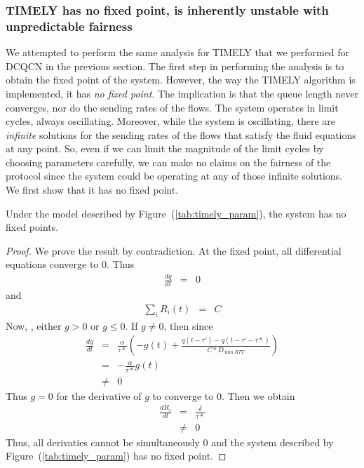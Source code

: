 \subsubsection{TIMELY has no fixed point, is inherently unstable with
unpredictable fairness}
We attempted to perform the same analysis for TIMELY that we performed for DCQCN
in the previous section.  The first step in performing the analysis is to obtain
the fixed point of the system.  However, the way the TIMELY algorithm is
implemented, it has \emph{no fixed point}. The implication is that the queue
length never converges, nor do the sending rates of the flows. The system
operates in limit cycles, always oscillating. Moreover, while the system is
oscillating, there are \emph{infinite} solutions for the sending rates of the
flows that satisfy the fluid equations at any point. So, even if we can limit
the magnitude of the limit cycles by choosing parameters carefully, we can make
no claims on the fairness of the protocol since the system could be operating at
any of those infinite solutions. We first show that it has no fixed point.

\begin{thm} 
\label{thm:nofixed}
Under the model described by Figure~(\ref{tab:timely_param}), the system has no
fixed points.
\end{thm}
\begin{proof}
We prove the result by contradiction. At the fixed point, all
differential equations converge to 0. Thus
\begin{eqnarray*}
\frac{dq}{dt} & =& 0 
\end{eqnarray*}  and 
\begin{eqnarray*} \sum_{i} R_i(t) & = & C \end{eqnarray*}
Now, , either $g > 0$ or $g  \le 0$. If $g \ne 0$, then since 
\begin{eqnarray*}
\frac{{dg}}{{dt}} & = & \frac{\alpha }{{\tau *}}( - g(t) + \frac{{q(t
                        - \tau ') - q(t - \tau ' - \tau
                        *)}}{{C*{D_{\min RTT}}}})\\
& = &  -\frac{\alpha }{{\tau *}} g(t)  \\
& \ne & 0 
\end{eqnarray*}
Thus $ g = 0$ for the derivative of  $g$ to converge to 0. Then we obtain
\begin{eqnarray*}
 \frac{dR_i}{dt} & = & \frac{\delta }{{\tau *}}\\
& \ne & 0
\end{eqnarray*}
Thus, all derivaties cannot be simultaneously 0 and the system
described by Figure~(\ref{tab:timely_param}) has no fixed point.
\end{proof}

